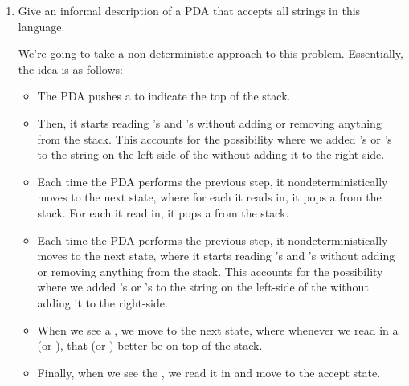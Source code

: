 \documentclass[letterpaper]{article}
\begin{document}
\begin{enumerate}
    \item Give an informal description of a PDA that accepts all strings in this language. 
    \begin{mdframed}[]
        We're going to take a non-deterministic approach to this problem. Essentially, the idea is as follows: 
        \begin{itemize}
            \item The PDA pushes a \code{\$} to indicate the top of the stack. 
            \item Then, it starts reading 's and 's without adding or removing anything from the stack. This accounts for the possibility where we added 's or 's to the string on the left-side of the \code{\#} without adding it to the right-side. 
            \item Each time the PDA performs the previous step, it nondeterministically moves to the next state, where for each  it reads in, it pops a  from the stack. For each  it read in, it pops a  from the stack. 
            \item Each time the PDA performs the previous step, it nondeterministically moves to the next state, where it starts reading 's and 's without adding or removing anything from the stack. This accounts for the possibility where we added 's or 's to the string on the left-side of the \code{\#} without adding it to the right-side.
            \item When we see a \code{\#}, we move to the next state, where whenever we read in a  (or ), that  (or ) better be on top of the stack. 
            \item Finally, when we see the \code{\$}, we read it in and move to the accept state. 
        \end{itemize}
    \end{mdframed}


\end{enumerate}
\end{document}
